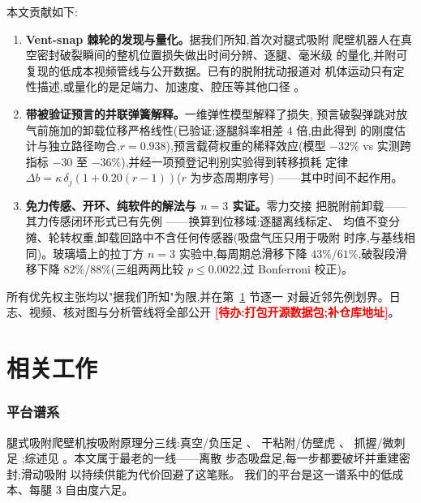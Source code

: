 \documentclass[journal]{IEEEtran}
\newcommand{\TODO}[1]{\textcolor{red}{\textbf{[待办:#1]}}}
\begin{document}
本文贡献如下:
\begin{enumerate}
\item \textbf{Vent-snap 棘轮的发现与量化。}据我们所知,首次对腿式吸附
爬壁机器人在真空密封破裂瞬间的整机位置损失做出时间分辨、逐腿、毫米级
的量化,并附可复现的低成本视频管线与公开数据。已有的脱附扰动报道对
机体运动只有定性描述,或量化的是足端力、加速度、腔压等其他口径
\cite{kim2008smooth,pei2023review,pan2005suction}。
\item \textbf{带被验证预言的并联弹簧解释。}一维弹性模型解释了损失,
预言破裂弹跳对放气前施加的卸载位移严格线性(已验证;逐腿斜率相差 $4$ 倍,由此得到
的刚度估计与独立路径吻合,$r=0.938$),预言载荷权重的稀释效应(模型
$-32\%$ vs 实测跨指标 $-30$ 至 $-36\%$),并经一项预登记判别实验得到转移损耗
定律 $\Delta b=\kappa\,\delta_j(1+0.20(r{-}1))$($r$ 为步态周期序号)
——其中时间不起作用。
\item \textbf{免力传感、开环、纯软件的解法与 $n{=}3$ 实证。}零力交接
把脱附前卸载——其力传感闭环形式已有先例
\cite{cutkosky2010patent,nadan2024loris}——换算到位移域:逐腿离线标定、
均值不变分摊、轮转权重,卸载回路中不含任何传感器(吸盘气压只用于吸附
时序,与基线相同)。玻璃墙上的拉丁方
$n{=}3$ 实验中,每周期总滑移下降 $43\%$/$61\%$,破裂段滑移下降
$82\%$/$88\%$(三组两两比较 $p\le0.0022$,过 Bonferroni 校正)。
\end{enumerate}

所有优先权主张均以"据我们所知"为限,并在第~\ref{sec:related} 节逐一
对最近邻先例划界。日志、视频、核对图与分析管线将全部公开
\TODO{打包开源数据包;补仓库地址}。

\section{相关工作}
\label{sec:related}

\subsubsection{平台谱系}腿式吸附爬壁机按吸附原理分三线:真空/负压足
\cite{hirose1991ninja,zhang2006sky,guan2013wclimbot,li2025biped}、
干粘附/仿壁虎
\cite{unver2006geckobot,kim2008smooth,henrey2014abigaille}、
抓握/微刺足 \cite{parness2017lemur,nadan2024loris};综述见
\cite{nansai2016survey,tao2023climbing}。本文属于最老的一线——离散
步态吸盘足,每一步都要破坏并重建密封;滑动吸附
\cite{longo2004alicia,yue2024snail} 以持续供能为代价回避了这笔账。
我们的平台是这一谱系中的低成本、每腿 3 自由度六足。
\end{document}
